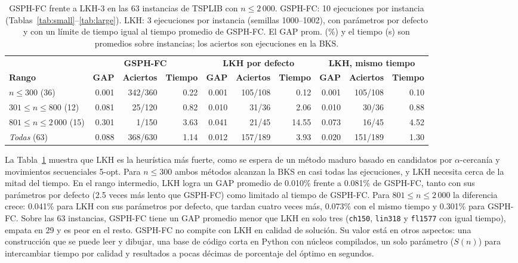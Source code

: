 \documentclass[runningheads]{llncs}
\begin{document}
\begin{table}
\caption{GSPH-FC frente a LKH-3 en las 63 instancias de TSPLIB con
$n\le 2\,000$. GSPH-FC: 10 ejecuciones por instancia
(Tablas~\ref{tab:small}--\ref{tab:large}). LKH: 3 ejecuciones por
instancia (semillas 1000--1002), con parámetros por defecto y con un
límite de tiempo igual al tiempo promedio de GSPH-FC. El GAP prom. (\%)
y el tiempo (s) son promedios sobre instancias; los aciertos son
ejecuciones en la BKS.}
\label{tab:lkh}
\centering\scriptsize
\begin{tabular}{@{}lrrrrrrrrr@{}}
\toprule
& \multicolumn{3}{c}{\textbf{GSPH-FC}} & \multicolumn{3}{c}{\textbf{LKH por defecto}} & \multicolumn{3}{c}{\textbf{LKH, mismo tiempo}}\\
\cmidrule(lr){2-4}\cmidrule(lr){5-7}\cmidrule(lr){8-10}
\textbf{Rango} & \textbf{GAP} & \textbf{Aciertos} & \textbf{Tiempo} & \textbf{GAP} & \textbf{Aciertos} & \textbf{Tiempo} & \textbf{GAP} & \textbf{Aciertos} & \textbf{Tiempo}\\
\midrule
$n\le 300$ (36)           & 0.001 & 342/360 & 0.22 & 0.001 & 105/108 &  0.12 & 0.001 & 105/108 & 0.10 \\
$301\le n\le 800$ (12)    & 0.081 &  25/120 & 0.82 & 0.010 &  31/36  &  2.06 & 0.010 &  30/36  & 0.88 \\
$801\le n\le 2\,000$ (15)& 0.301 &   1/150 & 3.63 & 0.041 &  21/45  & 14.55 & 0.073 &  16/45  & 4.52 \\
\midrule
\textit{Todas} (63)       & 0.088 & 368/630 & 1.14 & 0.012 & 157/189 &  3.93 & 0.020 & 151/189 & 1.30 \\
\bottomrule
\end{tabular}
\end{table}

La Tabla~\ref{tab:lkh} muestra que LKH es la heurística más fuerte, como
se espera de un método maduro basado en candidatos por $\alpha$-cercanía
y movimientos secuenciales 5-opt. Para $n\le 300$ ambos métodos alcanzan
la BKS en casi todas las ejecuciones, y LKH necesita cerca de la mitad
del tiempo. En el rango intermedio, LKH logra un GAP promedio de 0.010\%
frente a 0.081\% de GSPH-FC, tanto con sus parámetros por defecto (2.5
veces más lento que GSPH-FC) como limitado al tiempo de GSPH-FC. Para
$801\le n\le 2\,000$ la diferencia crece: 0.041\% para LKH con sus
parámetros por defecto, que tardan cuatro veces más, 0.073\% con el
mismo tiempo y 0.301\% para GSPH-FC. Sobre las 63 instancias, GSPH-FC
tiene un GAP promedio menor que LKH en solo tres
(\texttt{ch150}, \texttt{lin318} y \texttt{fl1577} con igual tiempo),
empata en 29 y es peor en el resto. GSPH-FC no compite con LKH en
calidad de solución. Su valor está en otros aspectos: una construcción
que se puede leer y dibujar, una base de código corta en Python con
núcleos compilados, un solo parámetro ($S(n)$) para intercambiar tiempo
por calidad y resultados a pocas décimas de porcentaje del óptimo en
segundos.
\end{document}
